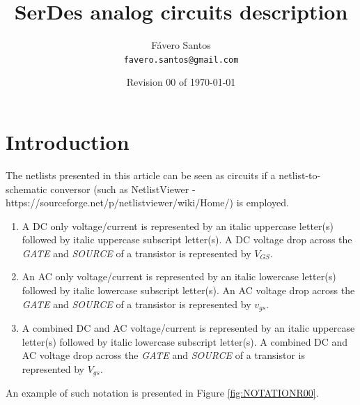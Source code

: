 \documentclass{article}
\title{SerDes analog circuits description} %
\author{Fávero Santos\\ \texttt{favero.santos@gmail.com}} %
\date{Revision 00 of \today} %
\begin{document}
\maketitle %


\section*{Introduction}

The netlists presented in this article can be seen as circuits if a netlist-to-schematic conversor (such as NetlistViewer - https://sourceforge.net/p/netlistviewer/wiki/Home/) is employed.

\begin{info} %
	\begin{enumerate}[i]
		\item A DC only voltage/current is represented by an italic uppercase letter(s) followed by italic uppercase subscript letter(s).
		\subitem A DC voltage drop across the \textit{GATE} and \textit{SOURCE} of a transistor is represented by \textit{$V_{GS}$}.
		\item An AC only voltage/current is represented by an italic lowercase letter(s) followed by italic lowercase subscript letter(s).
		\subitem An AC voltage drop across the \textit{GATE} and \textit{SOURCE} of a transistor is represented by \textit{$v_{gs}$}.
		\item A combined DC and AC voltage/current is represented by an italic uppercase letter(s) followed by italic lowercase subscript letter(s).
		\subitem A combined DC and AC voltage drop across the \textit{GATE} and \textit{SOURCE} of a transistor is represented by \textit{$V_{gs}$}.
	\end{enumerate}
	An example of such notation is presented in Figure \ref{fig:NOTATIONR00}.
\end{info}
\end{document}
